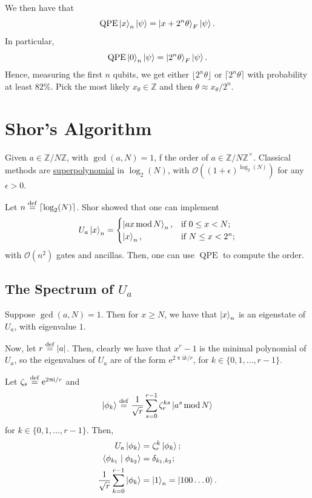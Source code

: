 \documentclass[12pt]{amsart}
\theoremstyle{plain}
\theoremstyle{definition}
\theoremstyle{remark}
\newcommand{\mcal}{\mathcal}
\newcommand{\Z}{\mathbb{Z}}
\newcommand{\me}{\mathrm{e}}
\newcommand{\mi}{\mathrm{i}}
\newcommand{\mpi}{\uppi}
\newcommand{\idef}{\overset{{\rm def}}{=}}
\newcommand{\abs}[1]{\left| #1 \right|}
\DeclareMathOperator{\qpe}{QPE}  %
\DeclareMathOperator{\mmod}{mod}
\begin{document}
We then have that
\[
  \qpe \ket{x}_n \ket{\psi} = \ket{x + 2^n \theta}_F \ket{\psi}.
\]
In particular,
\[
  \qpe \ket{0}_n \ket{\psi} = \ket{2^n \theta}_F \ket{\psi}.
\]
Hence, measuring the first $n$ qubits, we get either $\lfloor 2^n \theta \rfloor$ or $\lceil 2^n \theta \rceil$ with probability at least $82\%$.  Pick the most likely $x_{\theta} \in \Z$ and then $\theta \approx x_{\theta} / 2^n$.


\section{Shor's Algorithm}\label{sec:shor}

Given $a \in \Z/{N}\Z$, with $\gcd(a, N) = 1$, f the order of $a \in {\Z/{N}\Z}^{\times}$.  Classical methods are \href{https://en.wikipedia.org/wiki/Time_complexity#Superpolynomial_time}{superpolynomial} in $\log_2(N)$, with $\mcal{O}\left({(1 + \epsilon)}^{\log_2(N)}\right)$ for any $\epsilon > 0$.


Let $n \idef \lceil \log_2(N) \rceil$.  Shor showed that one can implement
\[
  U_a \ket{x}_{n} =
  \begin{cases}
    \ket{ax \mmod{N}}_n, & \text{if $0 \leq x < N$}; \\
    \ket{x}_n, & \text{if $N \leq x < 2^n$};
  \end{cases}
\]
with $\mcal{O}(n^2)$ gates and ancillas.  Then, one can use $\qpe$ to compute the order.


\subsection{The Spectrum of $U_a$}

Suppose $\gcd(a, N) = 1$.  Then for $x \geq N$, we have that $\ket{x}_n$ is an eigenstate of $U_a$, with eigenvalue $1$.

Now, let $r \idef \abs{a}$.  Then, clearly we have that $x^r - 1$ is the minimal polynomial of $U_a$, so the eigenvalues of $U_a$ are of the form $\me^{2 \mpi \mi k /r}$, for $k \in \{0, 1, \ldots , r-1\}$.

Let $\zeta_s \idef \me^{2 \mpi \mi/r}$ and
\[
  \ket{\phi_k} \idef \frac{1}{\sqrt{r}} \sum_{s=0}^{r-1} \zeta_r^{ks} \ket{a^s \mmod N}
\]
for $k \in \{0, 1, \ldots, r-1\}$.  Then,
\begin{align*}
  U_a \ket{\phi_k} &= \zeta_r^k \ket{\phi_k}; \\
  \langle \phi_{k_1} \mid \phi_{k_2} \rangle &= \delta_{k_1, k_2}; \\
  \frac{1}{\sqrt{r}} \sum_{k=0}^{r-1} \ket{\phi_k} &= \ket{1}_n = \ket{100 \ldots 0}.
\end{align*}
\end{document}
